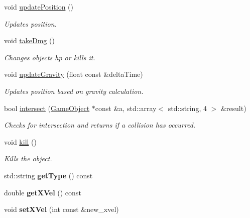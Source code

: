 \begin{DoxyCompactItemize}
\item 
void \hyperlink{class_game_object_a5334326f93fee2f6bd0b5cb0cea1f858}{update\+Position} ()
\begin{DoxyCompactList}\small\item\em Updates position. \end{DoxyCompactList}\item 
void \hyperlink{class_game_object_a8c19716181d12dd100bd5fde8fdb09bb}{take\+Dmg} ()
\begin{DoxyCompactList}\small\item\em Changes objects hp or kills it. \end{DoxyCompactList}\item 
void \hyperlink{class_game_object_a14cc28b2288fcafb347360d9baaf6f15}{update\+Gravity} (float const \&delta\+Time)
\begin{DoxyCompactList}\small\item\em Updates position based on gravity calculation. \end{DoxyCompactList}\item 
bool \hyperlink{class_game_object_aa140af3122d8b8dd4b082774a9f879c4}{intersect} (\hyperlink{class_game_object}{Game\+Object} $\ast$const \&a, std\+::array$<$ std\+::string, 4 $>$ \&result)
\begin{DoxyCompactList}\small\item\em Checks for intersection and returns if a collision has occurred. \end{DoxyCompactList}\item 
void \hyperlink{class_game_object_af54107b086de78b1fc6190088bdfb468}{kill} ()
\begin{DoxyCompactList}\small\item\em Kills the object. \end{DoxyCompactList}\item 
\hypertarget{class_game_object_a3a4916a49e3dcad9c2f890a4ea41758f}{}std\+::string {\bfseries get\+Type} () const \label{class_game_object_a3a4916a49e3dcad9c2f890a4ea41758f}

\item 
\hypertarget{class_game_object_a29bf50e009a530b444f8157dc20c65df}{}double {\bfseries get\+X\+Vel} () const \label{class_game_object_a29bf50e009a530b444f8157dc20c65df}

\item 
\hypertarget{class_game_object_a6e0690e683eff5b5fa866161f2f17d02}{}void {\bfseries set\+X\+Vel} (int const \&new\+\_\+xvel)\label{class_game_object_a6e0690e683eff5b5fa866161f2f17d02}


\end{DoxyCompactItemize}
